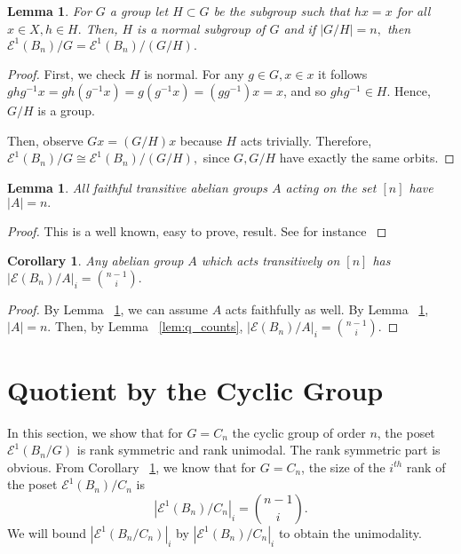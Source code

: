 \documentclass[10 pt]{amsart}
\theoremstyle{plain}
\newtheorem{lem}[thm]{Lemma}
\newtheorem{cor}[thm]{Corollary}
\theoremstyle{definition}
\theoremstyle{remark}
\numberwithin{equation}{section}
\begin{document}
\begin{lem}
\label{lem:faithful_action}
For $G$ a group let $H \subset G$ be the subgroup such that $hx = x$ for all $x \in X,h \in H.$ Then, $H$ is a normal subgroup of $G$ and if $|G/H| = n,$ then $\mathcal E^1(B_n)/G =\mathcal E^1(B_n)/(G/H).$
\end{lem}
\begin{proof}
First, we check $H$ is normal. For any $g \in G,x \in x$ it follows $ghg^{-1}x = gh(g^{-1}x) = g(g^{-1}x) = (gg^{-1})x = x$, and so $ghg^{-1} \in H.$ Hence, $G/H$ is a group.

Then, observe $Gx = (G/H)x$ because $H$ acts trivially. Therefore, $\mathcal E^1(B_n)/G \cong \mathcal E^1(B_n)/(G/H),$ since $G,G/H$ have exactly the same orbits.
\end{proof}

\begin{lem}
\label{lem:transitive_abelian}
All faithful transitive abelian groups $A$ acting on the set $[n]$ have $|A| = n.$
\end{lem}
\begin{proof}
This is a well known, easy to prove, result. See for instance \cite{stack}
\end{proof}

\begin{cor}
\label{cor:transitive_abelian_ranks}
Any abelian group $A$ which acts transitively on $[n]$ has $|\mathcal E (B_n)/A|_i= \binom{n-1}{i}.$
\end{cor}
\begin{proof}
By Lemma ~\ref{lem:faithful_action}, we can assume $A$ acts faithfully as well.
By Lemma ~\ref{lem:transitive_abelian}, $|A| = n.$ Then, by Lemma ~\ref{lem:q_counts}, $|\mathcal E (B_n)/A|_i = \binom{n-1}{i}.$
\end{proof}









\section{Quotient by the Cyclic Group}
\label{sec:cyclic}

In this section, we show that for $G = C_n$ the cyclic group of order $n$, the poset $\mathcal E^1(B_n/G)$ is rank symmetric and rank unimodal. The rank symmetric part is obvious. From Corollary ~\ref{cor:transitive_abelian_ranks}, we know that for $G = C_n$, the size of the $i^{th}$ rank of the poset $\mathcal E^1 (B_n)/C_n$ is $$|\mathcal E^1 (B_n)/C_n|_{i} = \binom{n-1}{i}.$$
We will bound $|\mathcal E^1(B_n/C_n)|_{i}$ by  $|\mathcal E^1 (B_n)/C_n|_{i}$ to obtain the unimodality. 
\end{document}
